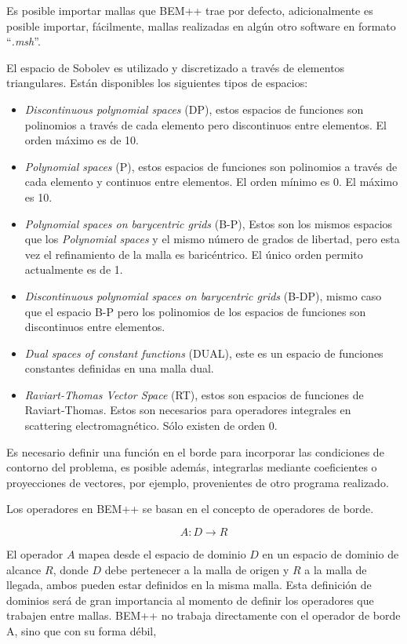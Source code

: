 \documentclass[12pt,letterpaper]{article}
\numberwithin{equation}{section}
\begin{document}
Es posible importar mallas que BEM++ trae por defecto, adicionalmente es posible importar, fácilmente, mallas realizadas en algún otro software en formato ``\textit{.msh}''.

El espacio de Sobolev es utilizado y discretizado a través de elementos triangulares. Están disponibles los siguientes tipos de espacios:

\begin{itemize}
	\item \textit{Discontinuous polynomial spaces} (DP), estos espacios de funciones son polinomios a través de cada elemento pero discontinuos entre elementos. El orden máximo es de 10.
	\item \textit{Polynomial spaces} (P), estos espacios de funciones son polinomios a través de cada elemento y continuos entre elementos. El orden mínimo es 0. El máximo es 10.
	\item \textit{Polynomial spaces on barycentric grids} (B-P), Estos son los mismos espacios que los \textit{Polynomial spaces} y el mismo número de grados de libertad, pero esta vez el refinamiento de la malla es baricéntrico. El único orden permito actualmente es de 1.
	\item \textit{Discontinuous polynomial spaces on barycentric grids} (B-DP), mismo caso que el espacio B-P pero los polinomios de los espacios de funciones son discontinuos entre elementos.
	\item \textit{Dual spaces of constant functions} (DUAL), este es un espacio de funciones constantes definidas en una malla dual.
	\item \textit{Raviart-Thomas Vector Space} (RT), estos son espacios de funciones de Raviart-Thomas. Estos son necesarios para operadores integrales en scattering electromagnético. Sólo existen de orden 0.
\end{itemize}

Es necesario definir una función en el borde para incorporar las condiciones de contorno del problema, es posible además, integrarlas mediante coeficientes o proyecciones de vectores, por ejemplo, provenientes de otro programa realizado.

Los operadores en BEM++ se basan en el concepto de operadores de borde.

$$A\colon D\rightarrow R$$

El operador $A$ mapea desde el espacio de dominio $D$ en un espacio de dominio de alcance $R$, donde $D$ debe pertenecer a la malla de origen y $R$ a la malla de llegada, ambos pueden estar definidos en la misma malla. Esta definición de dominios será de gran importancia al momento de definir los operadores que trabajen entre mallas. BEM++ no trabaja directamente con el operador de borde A, sino que con su forma débil,
\end{document}
